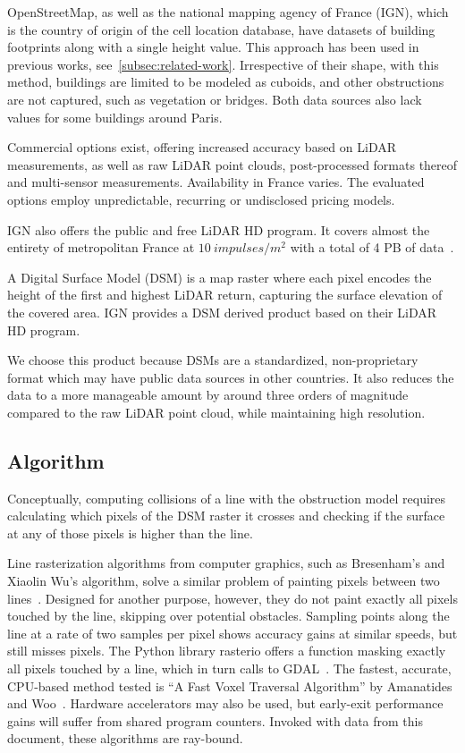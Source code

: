 OpenStreetMap, as well as the national mapping agency of France (IGN), which is the country of origin of the cell location database, have datasets of building footprints along with a single height value.
This approach has been used in previous works, see~\cref{subsec:related-work}.
Irrespective of their shape, with this method, buildings are limited to be modeled as cuboids, and other obstructions are not captured, such as vegetation or bridges.
Both data sources also lack values for some buildings around Paris.

Commercial options exist, offering increased accuracy based on LiDAR measurements, as well as raw LiDAR point clouds, post-processed formats thereof and multi-sensor measurements.
Availability in France varies.
The evaluated options employ unpredictable, recurring or undisclosed pricing models.

IGN also offers the public and free LiDAR HD program.
It covers almost the entirety of metropolitan France at $10\ impulses/m^2$ with a total of 4 PB of data~\cite{lidar}.

A Digital Surface Model (DSM) is a map raster where each pixel encodes the height of the first and highest LiDAR return, capturing the surface elevation of the covered area.
IGN provides a DSM derived product based on their LiDAR HD program.

We choose this product because DSMs are a standardized, non-proprietary format which may have public data sources in other countries.
It also reduces the data to a more manageable amount by around three orders of magnitude compared to the raw LiDAR point cloud, while maintaining high resolution.

\subsection*{Algorithm}\label{subsec:algorithm}
Conceptually, computing collisions of a line with the obstruction model requires calculating which pixels of the DSM raster it crosses and checking if the surface at any of those pixels is higher than the line.

Line rasterization algorithms from computer graphics, such as Bresenham's and Xiaolin Wu's algorithm, solve a similar problem of painting pixels between two lines~\cite{bresenham, xiaolinwu}.
Designed for another purpose, however, they do not paint exactly all pixels touched by the line, skipping over potential obstacles.
Sampling points along the line at a rate of two samples per pixel shows accuracy gains at similar speeds, but still misses pixels.
The Python library rasterio offers a function masking exactly all pixels touched by a line, which in turn calls to GDAL~\cite{gdal}.
The fastest, accurate, CPU-based method tested is ``A Fast Voxel Traversal Algorithm'' by Amanatides and Woo~\cite{amanatides1987fast}.
Hardware accelerators may also be used, but early-exit performance gains will suffer from shared program counters.
Invoked with data from this document, these algorithms are ray-bound.

